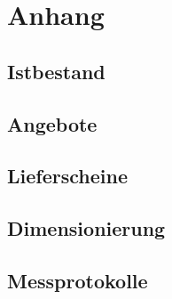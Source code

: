 
	\chapter{Anhang}
	\section{Istbestand}
	\section{Angebote}
	\section{Lieferscheine}
	\section{Dimensionierung}
	\section{Messprotokolle}
